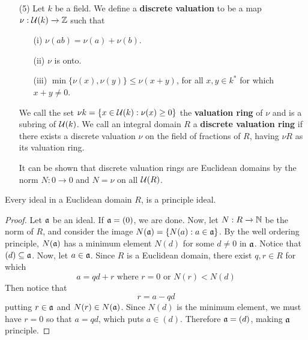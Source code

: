 \begin{example}
\begin{enumerate}
    \item[(5)] Let $k$ be a field. We define a  \textbf{discrete valuation}
      to be a map $\nu: \mathcal{U}(k) \xrightarrow{} \mathbb{Z}$ such that
      \begin{enumerate}
        \item[(i)] $\nu(ab)=\nu(a)+\nu(b)$.

        \item[(ii)] $\nu$ is onto.

        \item[(iii)] $\min{\{\nu(x),\nu(y)\}} \leq \nu(x+y)$, for all
          $x,y \in k^\ast$ for which  $x+y \neq 0$.
      \end{enumerate}
      We call the set $\nu{k}=\{x \in \mathcal{U}{(k)} : \nu(x) \geq 0\}$ the
      \textbf{valuation ring} of $\nu$ and is a subring of $\mathcal{U}{(k)}$. We
      call an integral domain  $R$ a  \textbf{discrete valuation ring} if
      there exists a discrete valuation $\nu$ on the field of fractions of
      $R$, having  $\nu{R}$ as its valuation ring.

      It can be shown that discrete valuation rings are Euclidean
      domains by the norm $N:0 \xrightarrow{} 0$ and $N=\nu$ on all
      $\mathcal{U}{(R)}$.
  \end{enumerate}
\end{example}

\begin{proposition}\label{proposition_6.1.1}
  Every ideal in a Euclidean domain $R$, is a principle ideal.
\end{proposition}
\begin{proof}
  Let $\mathfrak{a}$ be an ideal. If $\mathfrak{a}=(0)$, we are done. Now, let $N:R \xrightarrow{}
  \mathbb{N}$ be the norm of $R$, and consider the image $N(\mathfrak{a})=\{N(a) : a \in \mathfrak{a}\}$. By
  the well ordering principle, $N(\mathfrak{a})$ has a minimum element $N(d)$ for some
  $d \neq 0$ in $\mathfrak{a}$. Notice that  $(d) \subseteq \mathfrak{a}$. Now, let $a \in \mathfrak{a}$.
  Since $R$ is a Euclidean domain, there exist $q,r \in R$ for which
  \begin{equation*}
    a=qd+r \text{ where } r=0 \text{ or } N(r)<N(d)
  \end{equation*}
  Then notice that
  \begin{equation*}
    r=a-qd
  \end{equation*}
  putting $r \in \mathfrak{a}$ and  $N(r) \in N(\mathfrak{a})$. Since $N(d)$ is the minimum element,
  we must have $r=0$ so that  $a=qd$, which puts  $a \in (d)$. Therefore
  $\mathfrak{a}=(d)$, making $\mathfrak{a}$ principle.
\end{proof}

